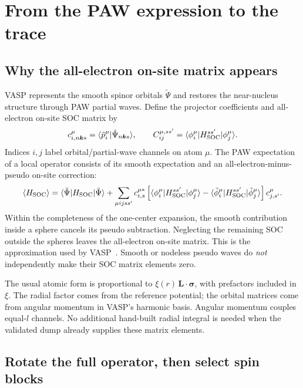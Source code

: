 \documentclass[11pt,a4paper]{article}
\numberwithin{equation}{section}
\newcommand{\vct}[1]{\bm{#1}}
\newcommand{\kh}{\vct k}
\newcommand{\code}[1]{\texttt{\detokenize{#1}}}
\begin{document}
\section{From the PAW expression to the trace}\label{sec:paw}

\subsection{Why the all-electron on-site matrix appears}

VASP represents the smooth spinor orbitals $\tilde\Psi$ and restores the
near-nucleus structure through PAW partial waves. Define the projector
coefficients and all-electron on-site SOC matrix by
\begin{equation}\label{eq:pawobjects}
 c^\mu_{i,n\kh s}=
 \langle\tilde p_i^\mu|\tilde\Psi_{n\kh s}\rangle,\qquad
 C^{\mu,ss'}_{ij}=
 \langle\phi_i^\mu|H_{\rm SOC}^{ss'}|\phi_j^\mu\rangle.
\end{equation}
Indices $i,j$ label orbital/partial-wave channels on atom $\mu$.
The PAW expectation of a local operator consists of its smooth expectation
and an all-electron-minus-pseudo on-site correction:
\begin{equation}\label{eq:paw}
 \langle H_{\rm SOC}\rangle=
 \langle\tilde\Psi|H_{\rm SOC}|\tilde\Psi\rangle+
 \sum_{\mu ijss'}c_{i,s}^{\mu *}
 \left[
 \langle\phi_i^\mu|H_{\rm SOC}^{ss'}|\phi_j^\mu\rangle-
 \langle\tilde\phi_i^\mu|H_{\rm SOC}^{ss'}|\tilde\phi_j^\mu\rangle
 \right]c_{j,s'}^\mu .
\end{equation}
Within the completeness of the one-center expansion, the smooth contribution
inside a sphere cancels its pseudo subtraction. Neglecting the remaining
SOC outside the spheres leaves the all-electron on-site matrix. This is the
approximation used by VASP~\cite{lsorbit}. Smooth or nodeless pseudo waves
do \emph{not} independently make their SOC matrix elements zero.

The usual atomic form is proportional to
$\xi(r)\,\vct L\cdot\vct\sigma$, with prefactors included in $\xi$.
The radial factor comes from the reference potential; the orbital matrices
come from angular momentum in VASP's harmonic basis. Angular momentum
couples equal-$l$ channels. No additional hand-built radial integral is
needed when the validated \code{CSO} dump already supplies these matrix
elements.

\subsection{Rotate the full operator, then select spin blocks}\label{sec:rotation}
\end{document}
